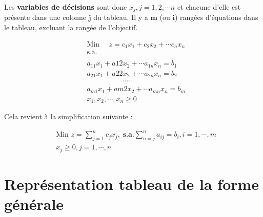\documentclass{report}
\begin{document}
\begin{multicols*}{2}
    Les \textbf{variables de décisions} sont donc $x_j, j = 1, 2, \cdots n$ et chacune 
    d'elle est 
    présente dans une colonne $\boldsymbol{j}$ du tableau. Il y a 
    $\boldsymbol{m}$ (ou $\boldsymbol{i}$) rangées d'équations 
    dans le tableau, excluant la rangée de l'objectif. 



    \begin{align*}
        &\text{Min } \quad z = c_1x_1 + c_2x_2 + \cdots c_nx_n \\ 
        &\text{s.a.}   \\\\ 
        &a_{11}x_1 + a{12}x_2 + \cdots a_{1n}x_n = b_1 \\
        &a_{21}x_1 + a{22}x_2 + \cdots a_{2n}x_n = b_2 \\
        &\quad\quad\quad\quad\quad \cdots\cdots  \\ 
        &a_{m1}x_1 + a{m2}x_2 + \cdots a_{mn}x_n = b_m \\
        &x_1, x_2, \cdots, x_n \geq 0 
     \end{align*}

     Cela revient à la simplification suivante :

     \begin{align*}
        &\text{Min } z = \sum_{j=1}^{n }c_jx_j, \; \textbf{s}.\textbf{a}.  
        \sum_{n=j}^{n }a_{ij} = b_i, i = 1, \cdots,  m \\ 
        &x_j \geq 0, j = 1, \cdots, n 
     \end{align*} 


\section{Représentation tableau de la forme générale}



\end{multicols*}
\end{document}
